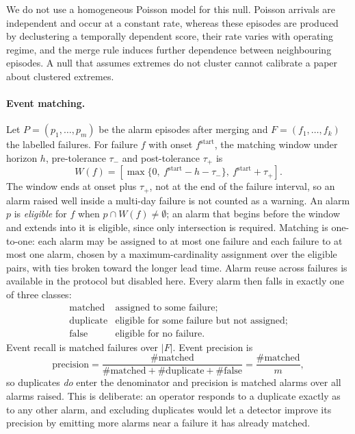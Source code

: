 We do not use a homogeneous Poisson model for this null. Poisson arrivals are independent and occur at a constant rate, whereas these episodes are produced by declustering a temporally dependent score, their rate varies with operating regime, and the merge rule induces further dependence between neighbouring episodes. A null that assumes extremes do not cluster cannot calibrate a paper about clustered extremes.

\paragraph{Event matching.} Let \(P=(p_1,\dots,p_m)\) be the alarm episodes after merging and \(F=(f_1,\dots,f_k)\) the labelled failures. For failure \(f\) with onset \(f^{\mathrm{start}}\), the matching window under horizon \(h\), pre-tolerance \(\tau_-\) and post-tolerance \(\tau_+\) is
\[
    W(f)=\left[\max\{0,\ f^{\mathrm{start}}-h-\tau_-\},\ f^{\mathrm{start}}+\tau_+\right].
\]
The window ends at onset plus \(\tau_+\), not at the end of the failure interval, so an alarm raised well inside a multi-day failure is not counted as a warning. An alarm \(p\) is \emph{eligible} for \(f\) when \(p\cap W(f)\neq\emptyset\); an alarm that begins before the window and extends into it is eligible, since only intersection is required. Matching is one-to-one: each alarm may be assigned to at most one failure and each failure to at most one alarm, chosen by a maximum-cardinality assignment over the eligible pairs, with ties broken toward the longer lead time. Alarm reuse across failures is available in the protocol but disabled here. Every alarm then falls in exactly one of three classes:
\[
\begin{array}{ll}
\text{matched} & \text{assigned to some failure;}\\
\text{duplicate} & \text{eligible for some failure but not assigned;}\\
\text{false} & \text{eligible for no failure.}
\end{array}
\]
Event recall is matched failures over \(|F|\). Event precision is
\[
    \mathrm{precision}=\frac{\#\text{matched}}{\#\text{matched}+\#\text{duplicate}+\#\text{false}}=\frac{\#\text{matched}}{m},
\]
so duplicates \emph{do} enter the denominator and precision is matched alarms over all alarms raised. This is deliberate: an operator responds to a duplicate exactly as to any other alarm, and excluding duplicates would let a detector improve its precision by emitting more alarms near a failure it has already matched.

